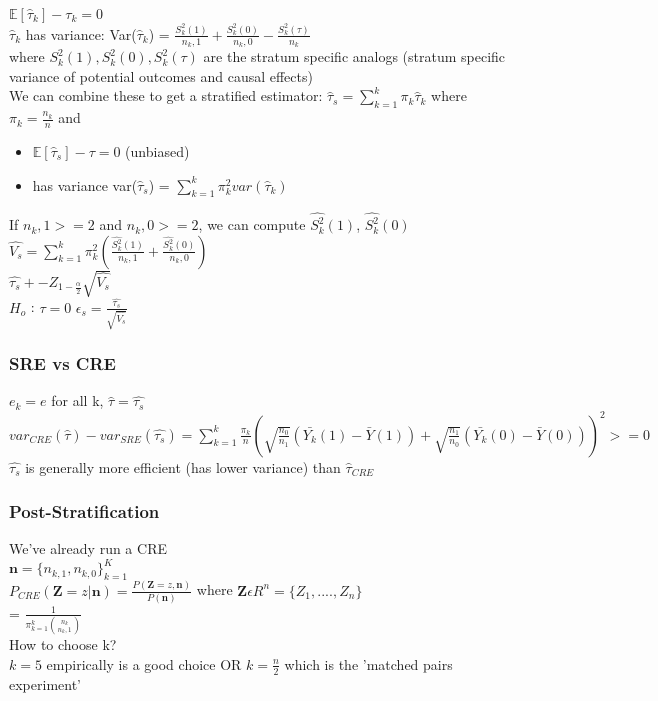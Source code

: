 $\mathbb{E}[\hat{\tau}_k] - {\tau}_k = 0$
\\$\hat{\tau}_k$ has variance:
Var($\hat{\tau}_k$) = $\frac{S_k^2 (1)}{n_k,1} + \frac{S_k^2 (0)}{n_k,0} - \frac{S_k^2 (\tau)}{n_k} $
\\where $S_k^2(1), S_k^2(0), S_k^2(\tau)$ are the stratum specific analogs (stratum specific variance of potential outcomes and causal effects)
\\We can combine these to get a stratified estimator: $\hat{\tau}_s = \sum_{k=1}^{k} \pi_k \hat{\tau}_k$ where $\pi_k = \frac{n_k}{n}$ and 
\begin{itemize}
    \item $\mathbb{E}[\hat{\tau}_s] - \tau = 0$ (unbiased)
    \item has variance var($\hat{\tau}_s$) = $\sum_{k=1}^{k} \pi_k^2 var(\hat{\tau}_k)$
\end{itemize}
If $n_k,1 >= 2$ and $n_k,0 >= 2$, we can compute $\hat{S_k^2}(1)$, $\hat{S_k^2}(0)$
\\$\hat{V_s} = \sum_{k=1}^{k} \pi_k^2 (\frac{\hat{S_k^2}(1)}{n_k,1} + \frac{\hat{S_k^2}(0)}{n_k,0})$
\\$\hat{\tau_s} +- Z_{1-\frac{\alpha}{2}} \sqrt{\hat{V_s}}$
\\$H_o$ : $\tau = 0 $ \quad $\epsilon_s = \frac{\hat{\tau_s}}{\sqrt{\hat{V_s}}}$

\subsubsection{SRE vs CRE}
$e_k = e$ for all k, $\hat{\tau} = \hat{\tau_s}$
\\$var_{CRE} (\hat{\tau}) - var_{SRE} (\hat{\tau_s}) = \sum_{k=1}^{k}\frac{\pi_k}{n} (\sqrt{\frac{n_0}{n_1}} (\bar{Y_k}(1) - \bar{Y}(1)) + \sqrt{\frac{n_1}{n_0}} (\bar{Y_k}(0) - \bar{Y}(0)))^2 >= 0 $
\\$\hat{\tau_s}$ is generally more efficient (has lower variance) than $\hat{\tau}_{CRE}$

\subsubsection{Post-Stratification}

We've already run a CRE
\\$\textbf{n} = \{n_{k,1}, n_{k,0}\}_{k=1}^{K}$
\\$P_{CRE} (\textbf{Z}=z | \textbf{n}) = \frac{P(\textbf{Z}=z, \textbf{n})}{P(\textbf{n})}$ where $\textbf{Z} \epsilon R^n = \{Z_1, ...., Z_n\}$
\\= $\frac{1}{\pi_{k=1}^k \binom{n_k}{n_k,1}}$
\\How to choose k?
\\$k=5$ empirically is a good choice OR $k = \frac{n}{2}$ which is the 'matched pairs experiment'


